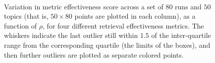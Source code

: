 \begin{figure}[t!]
\centering
{}
\\
\caption{Variation in metric effectiveness score across a set of $80$
runs and $50$ topics (that is, $50 \times 80$ points are plotted in
each column), as a function of $\rho$, for four different retrieval
effectiveness metrics.
The whiskers indicate the last outlier still within $1.5$ of the
inter-quartile range from the corresponding quartile (the limits of
the boxes), and then further outliers are plotted as separate colored
points.
\label{fig-score-variation}}
\end{figure}

